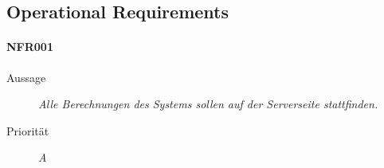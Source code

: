 \subsection{Operational Requirements}


\paragraph{NFR001}
\begin{description}
  \item[Aussage] \textit{Alle Berechnungen des Systems sollen auf der Serverseite stattfinden.}
  \item[Priorit\"at] \textit{A}
\end{description}
